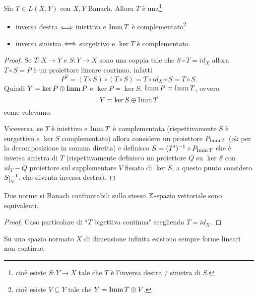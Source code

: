 \begin{proposition}\label{PrRetrazioniSezioniPerOperatoriLineariContinui}
Sia $T\in L(X,Y)$ con $X,Y$ Banach. Allora $T$ \`e una\footnote{cio\`e esiste $S:Y\to X$ tale che $T$ \`e l'inversa destra / sinistra di $S$.}
\begin{itemize}
    \item inversa destra $\Longleftrightarrow$ iniettiva e $\operatorname{Imm} T$ \`e complementato\footnote{cio\`e esiste $V\subseteq Y$ tale che $Y=\operatorname{Imm} T\oplus V$.}
    \item inversa sinistra $\Longleftrightarrow$ surgettivo e $\ker T$ \`e complementato.
\end{itemize}
\end{proposition}
\begin{proof}
Se $T:X\to Y$ e $S:Y\to X$ sono una coppia tale che $S\circ T=id_X$ allora $T\circ S=P$ \`e un proiettore lineare continuo, infatti
\[P^2=(T\circ S)\circ (T\circ S)=T\circ id_X \circ S=T\circ S.\]
Quindi $Y=\ker P\oplus \operatorname{Imm} P$ e $\ker P=\ker S$, $\operatorname{Imm} P=\operatorname{Imm} T$, ovvero
\[Y=\ker S\oplus \operatorname{Imm} T\]
come volevamo.
\medskip

Viceversa, se $T$ \`e iniettivo e $\operatorname{Imm} T$ \`e complementata (rispettivamente $S$ \`e surgettivo e $\ker S$ complementato) allora considero un proiettore $P_{\operatorname{Imm} T}$ (ok per la decomposizione in somma diretta) e definisco $S=(T')^{-1}\circ P_{\operatorname{Imm} T}$ che \`e inversa sinistra di $T$ (rispettivamente definisco un proiettore $Q$ su $\ker S$ con $id_Y-Q$ proiettore sul supplementare $V$ fissato di $\ker S$, a questo punto considero $S\res V\ii$, che diventa inversa destra).
\end{proof}

\begin{proposition}\label{PrNormeConfrontabiliSuBanachSonoEquivalenti}
Due norme si Banach confrontabili sullo stesso $\mathbb{K}$-spazio vettoriale sono equivalenti.
\end{proposition}
\begin{proof}
Caso particolare di ``$T$ bigettiva continua" scegliendo $T=id_X$.
\end{proof}

\begin{exercise}
Su uno spazio normato $X$ di dimensione infinita esistono sempre forme lineari non continue. 
\end{exercise}

